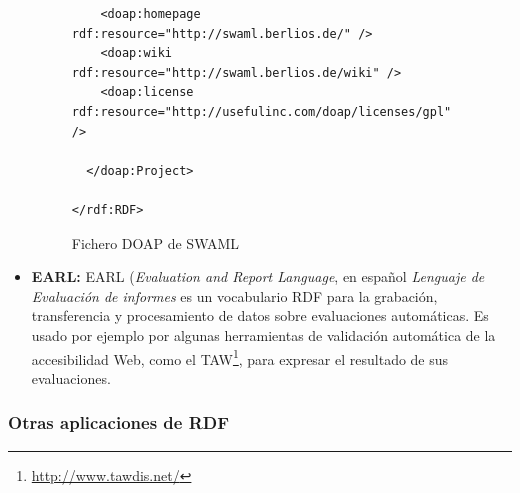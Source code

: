 \begin{itemize}
\begin{figure}[H]
\begin{lstlisting}
    <doap:homepage rdf:resource="http://swaml.berlios.de/" />
    <doap:wiki rdf:resource="http://swaml.berlios.de/wiki" />
    <doap:license rdf:resource="http://usefulinc.com/doap/licenses/gpl" />

  </doap:Project>

</rdf:RDF>
\end{lstlisting}
\caption{Fichero DOAP de SWAML}
\label{fig:ejemplo.doap}
\end{figure}

  \item \textbf{EARL:} EARL\cite{EARL} (\emph{Evaluation and Report Language}, 
	en español \emph{Lenguaje de Evaluación de informes} es un vocabulario 
     	RDF para la grabación, transferencia y procesamiento de datos sobre 
	evaluaciones automáticas. Es usado por ejemplo por algunas herramientas
	de validación automática de la accesibilidad Web, como el
	TAW\footnote{\url{http://www.tawdis.net/}}, para expresar el
	resultado de sus evaluaciones.

\end{itemize}

\subsubsection{Otras aplicaciones de RDF}

